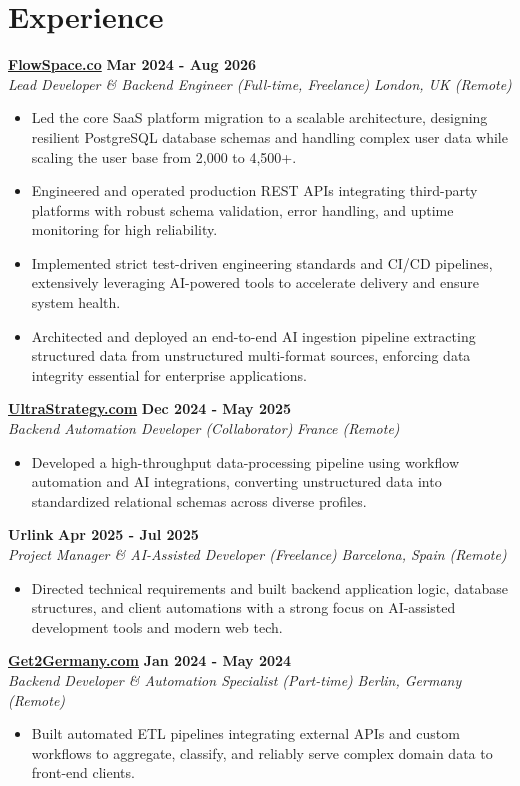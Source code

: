 \documentclass[a4paper,10pt]{article}
\newcommand{\role}[4]{%
 \textbf{#1} \hfill \textbf{#2}\\[1pt]%
 \textit{#3} \hfill \textit{#4}\\[2pt]%
}
\begin{document}
\section{Experience}

\role{\href{https://flowspace.co}{FlowSpace.co}}{Mar 2024 - Aug 2026}{Lead Developer \& Backend Engineer (Full-time, Freelance)}{London, UK (Remote)}
\begin{itemize}
 \item Led the core SaaS platform migration to a scalable architecture, designing resilient PostgreSQL database schemas and handling complex user data while scaling the user base from 2,000 to 4,500+.
 \item Engineered and operated production REST APIs integrating third-party platforms with robust schema validation, error handling, and uptime monitoring for high reliability.
 \item Implemented strict test-driven engineering standards and CI/CD pipelines, extensively leveraging AI-powered tools to accelerate delivery and ensure system health.
 \item Architected and deployed an end-to-end AI ingestion pipeline extracting structured data from unstructured multi-format sources, enforcing data integrity essential for enterprise applications.
\end{itemize}

\role{\href{https://ultrastrategy.com}{UltraStrategy.com}}{Dec 2024 - May 2025}{Backend Automation Developer (Collaborator)}{France (Remote)}
\begin{itemize}
 \item Developed a high-throughput data-processing pipeline using workflow automation and AI integrations, converting unstructured data into standardized relational schemas across diverse profiles.
\end{itemize}

\role{Urlink}{Apr 2025 - Jul 2025}{Project Manager \& AI-Assisted Developer (Freelance)}{Barcelona, Spain (Remote)}
\begin{itemize}
 \item Directed technical requirements and built backend application logic, database structures, and client automations with a strong focus on AI-assisted development tools and modern web tech.
\end{itemize}

\role{\href{https://get2germany.com}{Get2Germany.com}}{Jan 2024 - May 2024}{Backend Developer \& Automation Specialist (Part-time)}{Berlin, Germany (Remote)}
\begin{itemize}
 \item Built automated ETL pipelines integrating external APIs and custom workflows to aggregate, classify, and reliably serve complex domain data to front-end clients.
\end{itemize}
\end{document}
